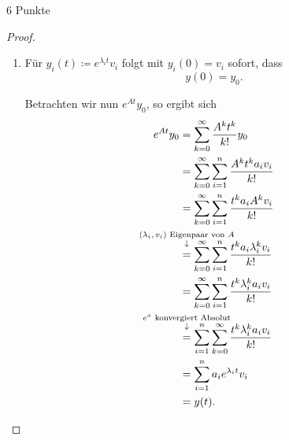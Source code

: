 \documentclass{problemset}
\begin{document}
\begin{problem}[Aufgabe 2]{6 Punkte}
\begin{proof}
\begin{enumerate}
        \item Für \(y_i(t) \coloneq e^{\lambda_it}v_i\) folgt mit \(y_i(0) =
              v_i\) sofort, dass
              \begin{equation*}
                  y(0) = y_0.
              \end{equation*}

              Betrachten wir nun \(e^{At}y_0\), so ergibt sich
              \begin{align*}
                  e^{At}y_0 & = \sum_{k=0}^{\infty} \frac{A^k t^k}{k!} y_0                                                                                  \\
                            & = \sum_{k=0}^{\infty} \sum_{i=1}^{n} \frac{A^k t^k a_i v_i}{k!}                                                               \\
                            & = \sum_{k=0}^{\infty} \sum_{i=1}^{n} \frac{t^k a_i A^k v_i}{k!}                                                               \\
                            & \annotated{\((\lambda_i, v_i)\) Eigenpaar von \(A\)}{=} \sum_{k=0}^{\infty} \sum_{i=1}^{n} \frac{t^k a_i \lambda_i^k v_i}{k!} \\
                            & = \sum_{k=0}^{\infty} \sum_{i=1}^{n} \frac{t^k \lambda_i^k a_i v_i}{k!}                                                       \\
                            & \annotated{\(e^x\) konvergiert Absolut}{=} \sum_{i=1}^{n} \sum_{k=0}^{\infty} \frac{t^k \lambda_i^k a_i v_i}{k!}              \\
                            & = \sum_{i=1}^{n} a_i e^{\lambda_i t} v_i                                                                                      \\
                            & = y(t).
              \end{align*}
    \end{enumerate}
\end{proof}

\end{problem}
\end{document}
